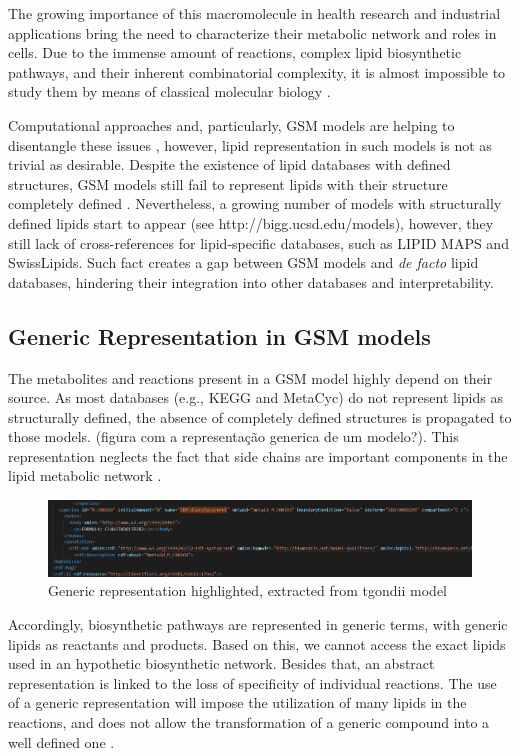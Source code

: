 \documentclass{llncs}
\begin{document}
The growing importance of this macromolecule in health research and industrial applications bring the need to characterize their metabolic network and roles in cells.
Due to the immense amount of reactions, complex lipid biosynthetic pathways, and their inherent combinatorial complexity, it is almost impossible to study them by means of classical molecular biology \cite{Schutzhold}.

Computational approaches and, particularly, GSM models are helping to disentangle these issues \cite{Schutzhold}, however, lipid representation in such models is not as trivial as desirable.
Despite the existence of lipid databases with defined structures, GSM models still fail to represent lipids with their structure completely defined \cite{Aung2013}. Nevertheless, a growing number of models with structurally defined lipids start to appear (see http://bigg.ucsd.edu/models), however, they still lack of cross-references for lipid-specific databases, such as LIPID MAPS and SwissLipids. Such fact creates a gap between GSM models and \textit{de facto} lipid databases, hindering their integration into other databases and interpretability.


\subsection{Generic Representation in GSM models}
The metabolites and reactions present in a GSM model highly depend on their source. As most databases (e.g., KEGG and MetaCyc) do not represent lipids as structurally defined, the absence of completely defined structures is propagated to those models. (figura com a representação generica de um modelo?). 
This representation neglects the fact that side chains are important components in the lipid metabolic network \cite{Schutzhold,Aung2013,Sanchez2019}.

\begin{figure}
    \includegraphics[width=\textwidth]{imagens/generica.png}
    \caption{Generic representation highlighted, extracted from tgondii model} \label{fig1}
\end{figure}

Accordingly, biosynthetic pathways are represented in generic terms, with generic lipids as reactants and products.
Based on this, we cannot access the exact lipids used in an hypothetic biosynthetic network.
Besides that, an abstract representation is linked to the loss of specificity of individual reactions. 
The use of a generic representation will impose the utilization of many lipids in the reactions, and does not allow the transformation of a generic compound into a well defined one \cite{Aung2013}.
\end{document}
